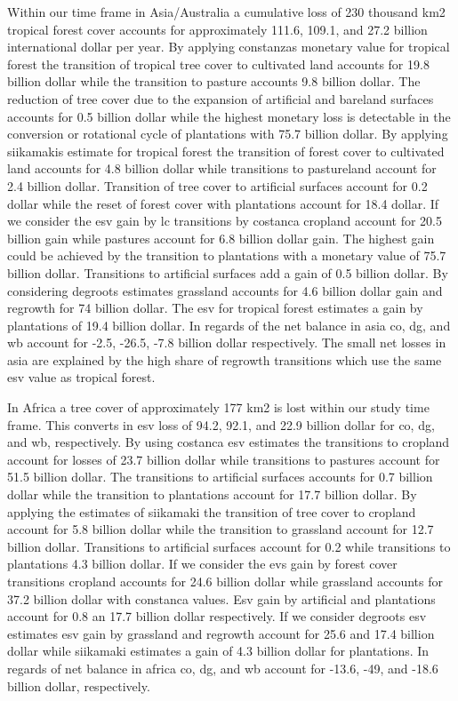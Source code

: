 		 Within our time frame in Asia/Australia a cumulative loss of 230 thousand km2 tropical forest cover accounts for approximately 111.6, 109.1, and 27.2 billion international dollar per year. By applying constanzas monetary value for tropical forest the transition of tropical tree cover to cultivated land accounts for 19.8 billion dollar while the transition to pasture accounts 9.8 billion dollar. The reduction of tree cover due to the expansion of artificial and bareland surfaces accounts for 0.5 billion dollar while the highest monetary loss is detectable in the conversion or rotational cycle of plantations with 75.7 billion dollar. By applying siikamakis estimate for tropical forest the transition of forest cover to cultivated land accounts for 4.8 billion dollar while transitions to pastureland account for 2.4 billion dollar. Transition of tree cover to artificial surfaces account for 0.2 dollar while the reset of forest cover with plantations account for 18.4 dollar. If we consider the esv gain by \ac{lc} transitions by costanca cropland account for 20.5 billion gain while pastures account for 6.8 billion dollar gain. The highest gain could be achieved by the transition to plantations with a monetary value of 75.7 billion dollar. Transitions to artificial surfaces add a gain of 0.5 billion dollar. By considering degroots estimates grassland accounts for 4.6 billion dollar gain and regrowth for 74 billion dollar. The esv for tropical forest estimates a gain by plantations of 19.4 billion dollar. In regards of the net balance in asia co, dg, and wb account for -2.5, -26.5, -7.8 billion dollar respectively. The small net losses in asia are explained by the high share of regrowth transitions which use the same esv value as tropical forest.

		 In Africa a tree cover of approximately 177 km2 is lost within our study time frame. This converts in esv loss of 94.2, 92.1, and 22.9 billion dollar for co, dg, and wb, respectively. By using costanca esv estimates the transitions to cropland account for losses of 23.7 billion dollar while transitions to pastures account for 51.5 billion dollar. The transitions to artificial surfaces accounts for 0.7 billion dollar while the transition to plantations account for 17.7 billion dollar. By applying the estimates of siikamaki the transition of tree cover to cropland account for 5.8 billion dollar while the transition to grassland account for 12.7 billion dollar. Transitions to artificial surfaces account for 0.2 while transitions to plantations 4.3 billion dollar. If we consider the evs gain by forest cover transitions cropland accounts for 24.6 billion dollar while grassland accounts for 37.2 billion dollar with constanca values. Esv gain by artificial and plantations account for 0.8 an 17.7 billion dollar respectively. If we consider degroots esv estimates esv gain by grassland and regrowth account for 25.6 and 17.4 billion dollar while siikamaki estimates a gain of 4.3 billion dollar for plantations. In regards of net balance in africa co, dg, and wb account for -13.6, -49, and -18.6 billion dollar, respectively. 

